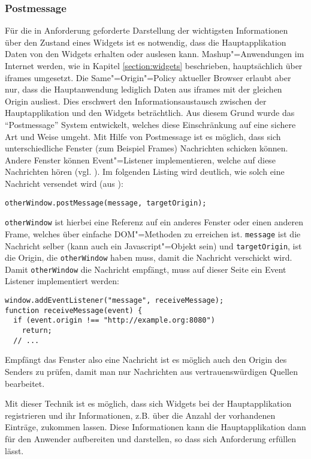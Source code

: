 \subsubsection*{Postmessage}
Für die in Anforderung  geforderte Darstellung der wichtigsten Informationen über den Zustand eines Widgets ist es notwendig, dass die Hauptapplikation Daten von den Widgets erhalten oder auslesen kann. Mashup"=Anwendungen im Internet werden, wie in Kapitel \ref{section:widgets} beschrieben, hauptsächlich über iframes umgesetzt. Die Same"=Origin"=Policy aktueller Browser erlaubt aber nur, dass die Hauptanwendung lediglich Daten aus iframes mit der gleichen Origin ausliest. Dies erschwert den Informationsaustausch zwischen der Hauptapplikation und den Widgets beträchtlich. Aus diesem Grund wurde das "`Postmessage"' System entwickelt, welches diese Einschränkung auf eine sichere Art und Weise umgeht. Mit Hilfe von Postmessage ist es möglich, dass sich unterschiedliche Fenster (zum Beispiel Frames) Nachrichten schicken können. Andere Fenster können Event"=Listener implementieren, welche auf diese Nachrichten hören (vgl. \cite{MDN2012}). Im folgenden Listing wird deutlich, wie solch eine Nachricht versendet wird (aus \cite{MDN2012}):
\begin{lstlisting}
otherWindow.postMessage(message, targetOrigin);
\end{lstlisting}
\texttt{otherWindow} ist hierbei eine Referenz auf ein anderes Fenster oder einen anderen Frame, welches über einfache \ac{DOM}"=Methoden zu erreichen ist. \texttt{message} ist die Nachricht selber (kann auch ein Javascript"=Objekt sein) und \texttt{targetOrigin}, ist die Origin, die \texttt{otherWindow} haben muss, damit die Nachricht verschickt wird. Damit \texttt{otherWindow} die Nachricht empfängt, muss auf dieser Seite ein Event Listener implementiert werden:
\begin{lstlisting}
window.addEventListener("message", receiveMessage);
function receiveMessage(event) {
  if (event.origin !== "http://example.org:8080")
    return;
  // ...
\end{lstlisting}
Empfängt das Fenster also eine Nachricht ist es möglich auch den Origin des Senders zu prüfen, damit man nur Nachrichten aus vertrauenswürdigen Quellen bearbeitet.

Mit dieser Technik ist es möglich, dass sich Widgets bei der Hauptapplikation registrieren und ihr Informationen, z.B. über die Anzahl der vorhandenen Einträge, zukommen lassen. Diese Informationen kann die Hauptapplikation dann für den Anwender aufbereiten und darstellen, so dass sich Anforderung  erfüllen lässt.

